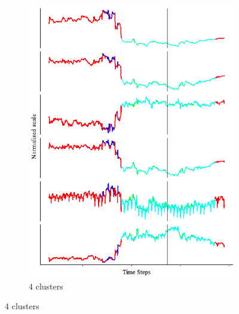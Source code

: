 \documentclass[11pt]{article} %
\theoremstyle{plain}
\theoremstyle{definition}
\begin{document}
\begin{figure}[H]
\begin{subfigure}[b]{0.4\textwidth}
		\includegraphics[width=\textwidth]{context_timeline_4.PNG}
		\caption{\(4\) clusters}
		\label{fig:context_timeline_4}
	\end{subfigure}
	

\end{figure}
\end{document}
